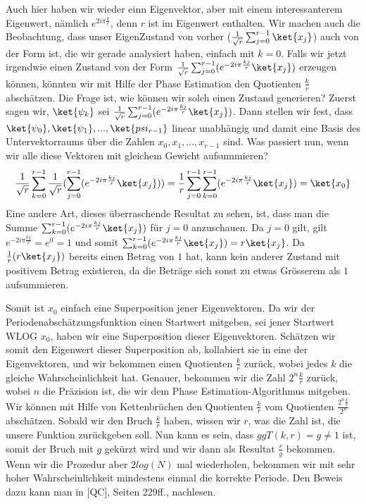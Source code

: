 Auch hier haben wir wieder einn Eigenvektor, aber mit einem interessanterem Eigenwert, nämlich $e^{2i\pi\frac{k}{r}}$, denn $r$ ist im Eigenwert enthalten. Wir machen auch die Beobachtung, dass unser EigenZustand von vorher ($\frac{1}{\sqrt{r}}\sum_{j = 0}^{r - 1}\ket{x_j}$) auch von der Form ist, die wir gerade analysiert haben, einfach mit $k = 0$. Falls wir jetzt irgendwie einen Zustand von der Form $\frac{1}{\sqrt{r}}\sum_{j = 0}^{r - 1}(e^{-2i\pi\frac{kj}{r}}\ket{x_j})$ erzeugen können, könnten wir mit Hilfe der Phase Estimation den Quotienten $\frac{k}{r}$ abschätzen. Die Frage ist, wie können wir solch einen Zustand generieren? Zuerst sagen wir, $\ket{\psi_k}$ sei $\frac{1}{\sqrt{r}}\sum_{j = 0}^{r - 1}(e^{-2i\pi\frac{kj}{r}}\ket{x_j})$. Dann stellen wir fest, dass $\ket{\psi_0}, \ket{\psi_1}, ..., \ket{psi_{r - 1}}$ linear unabhängig und damit eine Basis des Untervektorraums über die Zahlen $x_0, x_1, ..., x_{r - 1}$ sind. Was passiert nun, wenn wir alle diese Vektoren mit gleichem Gewicht aufsummieren?
\begin{align*}
    \frac{1}{\sqrt{r}}\sum_{k = 0}^{r - 1}\frac{1}{\sqrt{r}}(\sum_{j = 0}^{r - 1}(e^{-2i\pi\frac{kj}{r}}\ket{x_j})) = \frac{1}{r}\sum_{j = 0}^{r - 1}\sum_{k = 0}^{r - 1}(e^{-2i\pi\frac{kj}{r}}\ket{x_j}) = \ket{x_0}
\end{align*}
Eine andere Art, dieses überraschende Resultat zu sehen, ist, dass man die Summe $\sum_{k = 0}^{r - 1}(e^{-2i\pi\frac{kj}{r}}\ket{x_j})$ für $j = 0$ anzuschauen. Da $j = 0$ gilt, gilt $e^{-2i\pi\frac{kj}{r}} = e^{0} = 1$ und somit $\sum_{k = 0}^{r - 1}(e^{-2i\pi\frac{kj}{r}}\ket{x_j}) = r\ket{x_j}$. Da $\frac{1}{r}(r\ket{x_j})$ bereits einen Betrag von $1$ hat, kann kein anderer Zustand mit positivem Betrag existieren, da die Beträge sich sonst zu etwas Grösserem als $1$ aufsummieren.

Somit ist $x_0$ einfach eine Superposition jener Eigenvektoren. Da wir der Periodenabschätzungsfunktion einen Startwert mitgeben, sei jener Startwert WLOG $x_0$, haben wir eine Superposition dieser Eigenvektoren. Schätzen wir somit den Eigenwert dieser Superposition ab, kollabiert sie in eine der Eigenvektoren, und wir bekommen einen Quotienten $\frac{k}{r}$ zurück, wobei jedes $k$ die gleiche Wahrscheinlichkeit hat. Genauer, bekommen wir die Zahl $2^n\frac{k}{r}$ zurück, wobei $n$ die Präzision ist, die wir dem Phase Estimation-Algorithmus mitgeben. Wir können mit Hilfe von Kettenbrüchen den Quotienten $\frac{k}{r}$ vom Quotienten $\frac{2^n\frac{k}{r}}{2^n}$ abschätzen. Sobald wir den Bruch $\frac{k}{r}$ haben, wissen wir $r$, was die Zahl ist, die unsere Funktion zurückgeben soll. Nun kann es sein, dass $ggT(k, r) = g \neq 1$ ist, somit der Bruch mit $g$ gekürzt wird und wir dann als Resultat $\frac{r}{g}$ bekommen. Wenn wir die Prozedur aber $2log(N)$ mal wiederholen, bekommen wir mit sehr hoher Wahrscheinlichkeit mindestens einmal die korrekte Periode. Den Beweis dazu kann man in [QC], Seiten 229ff., nachlesen.

